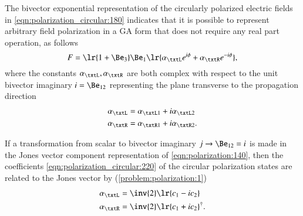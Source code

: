 The bivector exponential representation of the circularly polarized electric fields in \cref{eqn:polarization_circular:180} indicates that it is possible to represent arbitrary field polarization in a GA form that does not require any real part operation, as follows
\begin{dmath}\label{eqn:polarization_circular:200}
F = \lr{ 1 + \Be_3 } \Be_1 \lr{ \alpha_\txtL e^{i\phi} + \alpha_\txtR e^{-i\phi} },
\end{dmath}
where the constants \( \alpha_\txtL, \alpha_\txtR \) are both complex with respect to the unit bivector imaginary \( i = \Be_{12} \) representing the plane transverse to the propagation direction
\begin{dmath}\label{eqn:polarization_circular:220}
\begin{aligned}
\alpha_\txtL &= \alpha_{\txtL 1} + i \alpha_{\txtL 2} \\
\alpha_\txtR &= \alpha_{\txtR 1} + i \alpha_{\txtR 2}.
\end{aligned}
\end{dmath}

If a transformation from scalar to bivector imaginary \( j \rightarrow \Be_{12} = i \) is made in the Jones vector component representation of \cref{eqn:polarization:140},
then
the coefficients \cref{eqn:polarization_circular:220} of the circular polarization states are related to the Jones vector by (\cref{problem:polarization:1})
\begin{dmath}\label{eqn:polarization_circular:260}
\begin{aligned}
\alpha_\txtL &= \inv{2}\lr{ c_1 - i c_2 } \\
\alpha_\txtR &= \inv{2}\lr{ c_1 + i c_2 }^\dagger.
\end{aligned}
\end{dmath}
